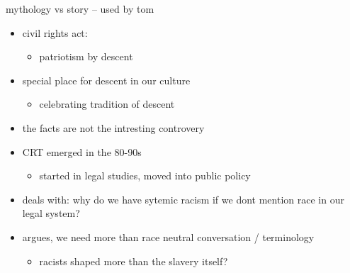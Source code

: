 \documentclass[letterpaper]{article}
\begin{document}
mythology vs story -- used by tom

\begin{itemize}
\item civil rights act:

\begin{itemize}
\item patriotism by descent
\end{itemize}

\item special place for descent in our culture

\begin{itemize}
\item celebrating tradition of descent
\end{itemize}

\item the facts are not the intresting controvery

\item CRT emerged in the 80-90s

\begin{itemize}
\item started in legal studies, moved into public policy
\end{itemize}

\item deals with: why do we have sytemic racism if we dont mention race in
our legal system?

\item argues, we need more than race neutral conversation / terminology

\begin{itemize}
\item racists shaped more than the slavery itself?
\end{itemize}
\end{itemize}
\end{document}
